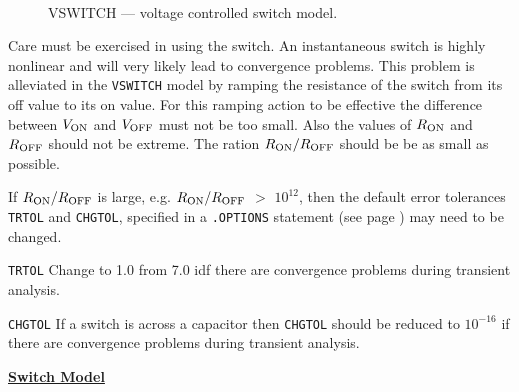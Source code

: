 \begin{figure}[h]
\centering
\ 
\caption{VSWITCH --- voltage controlled switch model. \label{vswitch}}
\end{figure}



Care must be exercised in using the switch.  An instantaneous switch
is highly nonlinear and will very likely lead to convergence problems.
This problem is alleviated in the {\tt VSWITCH} model by ramping the resistance
of the switch from its off value to its on value.  For this ramping action to be
effective the difference between $V_{\mbox{\scriptsize ON}}$ and $V_{\mbox{\scriptsize OFF}}$
must not be too small. Also the values of $R_{\mbox{\scriptsize ON}}$ and $R_{\mbox{\scriptsize OFF}}$
should not be extreme.
The ration $R_{\mbox{\scriptsize ON}}/R_{\mbox{\scriptsize OFF}}$ should be be as small as possible.

If $R_{\mbox{\scriptsize ON}}/R_{\mbox{\scriptsize OFF}}$  is large, e.g.
$R_{\mbox{\scriptsize ON}}/R_{\mbox{\scriptsize OFF}}$ $>$ $10^{12}$, then the default error tolerances
{\tt TRTOL} and {\tt CHGTOL}, specified in a {\tt .OPTIONS} statement
(see page \pageref{.OPTIONSstatement}) may need to be changed.
\begin{widelist}
\item[{\tt TRTOL}] Change to 1.0 from 7.0 idf there are convergence problems
during transient analysis.
\item[{\tt CHGTOL}] If a switch is across a capacitor then {\tt CHGTOL} should be
reduced to $10^{-16}$ if there are convergence problems
during transient analysis.
\end{widelist}

\noindent\underline{\bf \large Switch Model}\\[0.1in]

